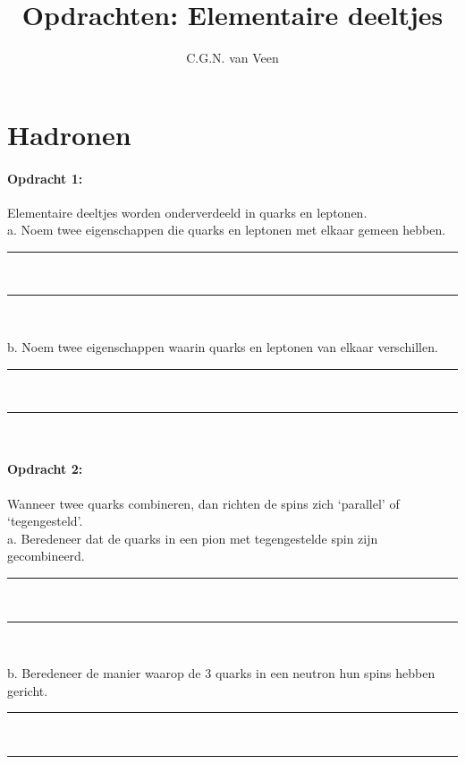 
\usepackage{hepnames}
\usepackage{mhchem}

\title{Opdrachten: Elementaire deeltjes}
\author{C.G.N. van Veen}



\maketitle

\section{Hadronen}

\paragraph{Opdracht 1:}
Elementaire deeltjes worden onderverdeeld in quarks en leptonen. \\ 
a. Noem twee eigenschappen die quarks en leptonen met elkaar gemeen hebben.
\begin{center}
    \rule{\textwidth}{0.3mm}\\
    \rule{\textwidth}{0.3mm}\\
\end{center}
b. Noem twee eigenschappen waarin quarks en leptonen van elkaar verschillen.
\begin{center}
    \rule{\textwidth}{0.3mm}\\
    \rule{\textwidth}{0.3mm}\\
\end{center}
\bigskip{}
\paragraph{Opdracht 2:}
Wanneer twee quarks combineren, dan richten de spins zich `parallel' 
of `tegengesteld'.\\
a. Beredeneer dat de quarks in een pion met tegengestelde spin zijn gecombineerd.
\begin{center}
    \rule{\textwidth}{0.3mm}\\
    \rule{\textwidth}{0.3mm}\\
\end{center}
b. Beredeneer de manier waarop de 3 quarks in een neutron hun spins hebben gericht.
\begin{center}
    \rule{\textwidth}{0.3mm}\\
    \rule{\textwidth}{0.3mm}\\
\end{center}

